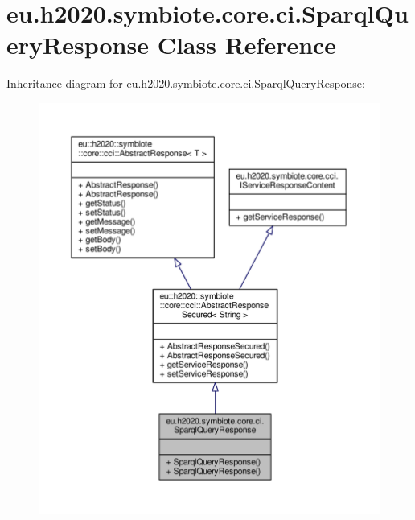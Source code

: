 \hypertarget{classeu_1_1h2020_1_1symbiote_1_1core_1_1ci_1_1SparqlQueryResponse}{}\section{eu.\+h2020.\+symbiote.\+core.\+ci.\+Sparql\+Query\+Response Class Reference}
\label{classeu_1_1h2020_1_1symbiote_1_1core_1_1ci_1_1SparqlQueryResponse}


Inheritance diagram for eu.\+h2020.\+symbiote.\+core.\+ci.\+Sparql\+Query\+Response\+:\nopagebreak
\begin{figure}[H]
\begin{center}
\leavevmode
\includegraphics[width=350pt]{classeu_1_1h2020_1_1symbiote_1_1core_1_1ci_1_1SparqlQueryResponse__inherit__graph}
\end{center}
\end{figure}


